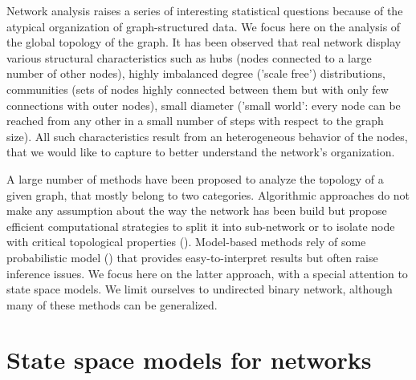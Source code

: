 \documentclass[graybox]{svmult}
\begin{document}
Network analysis raises a series of interesting statistical questions because of the atypical organization of graph-structured data. We focus here on the analysis of the global topology of the graph. It has been observed that real network display various structural characteristics such as hubs (nodes connected to a large number of other nodes), highly imbalanced degree ('scale free') distributions, communities (sets of nodes highly connected between them but with only few connections with outer nodes), small diameter ('small world': every node can be reached from any other in a small number of steps with respect to the graph size). All such characteristics result from an heterogeneous behavior of the nodes, that we would like to capture to better understand the network's organization.

A large number of methods have been proposed to analyze the topology of a given graph, that mostly belong to two categories. Algorithmic approaches do not make any assumption about the way the network has been build but propose efficient computational strategies to split it into sub-network or to isolate node with critical topological properties (\cite{NeG04}). Model-based methods rely of some probabilistic model (\cite{PaR07}) that provides easy-to-interpret results but often raise inference issues. We focus here on the latter approach, with a special attention to state space models. We limit ourselves to undirected binary network, although many of these methods can be generalized.


\section{State space models for networks}
\end{document}
